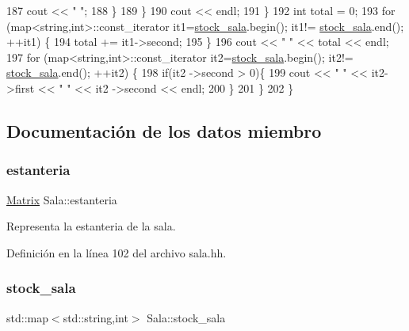 \begin{DoxyCode}
187                 cout << \textcolor{stringliteral}{" "};
188             \}
189         \}
190         cout << endl;
191     \}
192     \textcolor{keywordtype}{int} total = 0;
193     \textcolor{keywordflow}{for} (map<string,int>::const\_iterator it1=\mbox{\hyperlink{class_sala_a7c9511997ba4a6fac93625fd3f5c7703}{stock\_sala}}.begin(); it1!=
      \mbox{\hyperlink{class_sala_a7c9511997ba4a6fac93625fd3f5c7703}{stock\_sala}}.end(); ++it1) \{
194         total += it1->second;
195     \}
196     cout << \textcolor{stringliteral}{"  "} << total << endl;
197     \textcolor{keywordflow}{for} (map<string,int>::const\_iterator it2=\mbox{\hyperlink{class_sala_a7c9511997ba4a6fac93625fd3f5c7703}{stock\_sala}}.begin(); it2!=
      \mbox{\hyperlink{class_sala_a7c9511997ba4a6fac93625fd3f5c7703}{stock\_sala}}.end(); ++it2) \{
198         \textcolor{keywordflow}{if}(it2 ->second > 0)\{
199             cout << \textcolor{stringliteral}{"  "} << it2->first << \textcolor{stringliteral}{" "} << it2 ->second << endl;
200         \}
201     \}
202 \}
\end{DoxyCode}


\subsection{Documentación de los datos miembro}
\mbox{\label{class_sala_a8f5264818c98db9c0d075c51a7672d95}} 
\subsubsection{\texorpdfstring{estanteria}{estanteria}}
{\footnotesize\ttfamily \mbox{\hyperlink{almacen_8hh_acdf2b2dca71b1d617c96d1afa6a525fa}{Matrix}} Sala\+::estanteria\hspace{0.3cm}{\ttfamily [private]}}



Representa la estanteria de la sala. 



Definición en la línea 102 del archivo sala.\+hh.

\mbox{\label{class_sala_a7c9511997ba4a6fac93625fd3f5c7703}} 
\subsubsection{\texorpdfstring{stock\+\_\+sala}{stock\_sala}}
{\footnotesize\ttfamily std\+::map$<$std\+::string,int$>$ Sala\+::stock\+\_\+sala\hspace{0.3cm}{\ttfamily [private]}}



